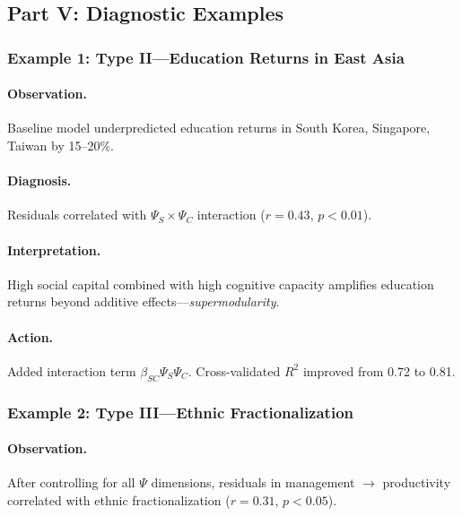 \subsection{Part V: Diagnostic Examples}

\subsubsection{Example 1: Type II---Education Returns in East Asia}

\paragraph{Observation.}
Baseline model underpredicted education returns in South Korea, Singapore, 
Taiwan by 15--20\%.

\paragraph{Diagnosis.}
Residuals correlated with $\Psi_S \times \Psi_C$ interaction ($r = 0.43$, $p < 0.01$).

\paragraph{Interpretation.}
High social capital combined with high cognitive capacity amplifies education 
returns beyond additive effects---\textit{supermodularity}.

\paragraph{Action.}
Added interaction term $\beta_{SC} \Psi_S \Psi_C$. Cross-validated $R^2$ 
improved from 0.72 to 0.81.

\subsubsection{Example 2: Type III---Ethnic Fractionalization}

\paragraph{Observation.}
After controlling for all $\Psi$ dimensions, residuals in management $\rightarrow$ 
productivity correlated with ethnic fractionalization ($r = 0.31$, $p < 0.05$).

